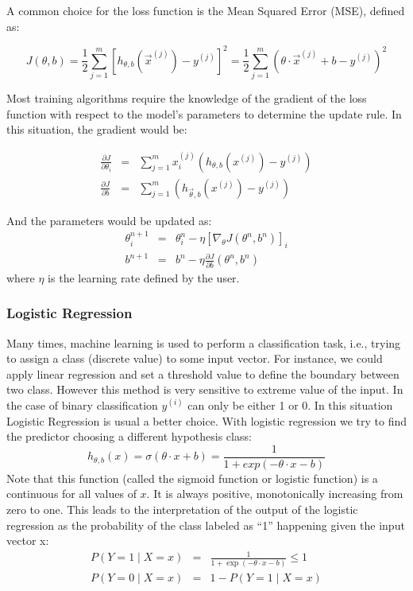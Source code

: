 \documentclass{article}
\begin{document}
A common choice for the loss function is the Mean Squared Error (MSE), defined as:

\begin{equation}
J \left( \theta , b\right) = \frac{1}{2} \sum_{j=1}^m \left[ h_{\theta,b} \left( \vec{x}^{(j)} \right) -  y^{(j)} \right]^2 =  \frac{1}{2} \sum_{j=1}^m \left( \theta \cdot \vec{x}^{(j)} + b - y ^{(j)} \right) ^2
\label{eq:MSE-definition}
\end{equation}

Most training algorithms require the knowledge of the gradient of the loss function with respect to the model's parameters to determine the update rule. In this situation, the gradient would be:

\begin{eqnarray}
\frac{ \partial J}{\partial \theta_i } &=& \sum _{j= 1}^m x_i^{(j)} (  h_{\theta, b} ( x^{(j)}) - y^{(j)} ) \\
\frac{ \partial J}{\partial b } &=&  \sum _{j= 1}^m (  h_{\vec{\theta}, b} ( x^{(j)}) - y^{(j)} )
\label{eq:MSE-gradient}
\end{eqnarray}

And the parameters would be updated as:
\begin{eqnarray}
\theta_i^{n+1} &=& \theta_i^{n} - \eta \left[\nabla_{\theta} J(\theta^n,b^n )\right]_i \\
b^{n+1} &=& b^n - \eta \frac{\partial J}{\partial b} \left(\theta^n,b^n \right)
\label{eq:GD-update-rule}
\end{eqnarray}
where $\eta$ is the learning rate defined by the user.


\subsubsection{Logistic Regression}
\label{subsubsec:Logistic-Regression}
Many times, machine learning is used to perform a classification task, i.e., trying to assign a class (discrete value) to some input vector. For instance, we could apply linear regression and set a  threshold value to define the boundary between two class. However this method is very sensitive to extreme value of the input. In the case of binary classification $y^{(i)}$ can only be either 1 or 0. In this situation Logistic Regression is usual a better choice. With logistic regression we try to find the predictor choosing a different hypothesis class: 
\begin{equation}
h_{ \theta, b } (x) = \sigma ( \theta \cdot x + b) = \frac{1}{ 1 + exp(-\theta \cdot x - b) }
\label{def:logistic-regression}
\end{equation}
Note that this function (called the sigmoid function or logistic function) is a continuous for all values of $x$. It is always positive, monotonically increasing from zero to one. This leads to the interpretation of the output of the logistic regression as the probability of the class labeled as “1” happening given the input vector x: 
\begin{eqnarray}
P( Y=1 \mid  X = x ) &=& \frac{1}{ 1 + \exp(-\theta \cdot x - b)} \leqslant 1 \\
P( Y=0 \mid  X = x ) &=& 1 - P( Y=1 \mid  X = x )
\end{eqnarray}
\end{document}
